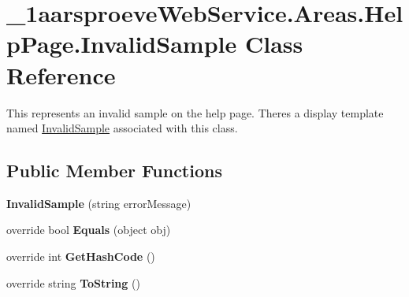 \hypertarget{class__1aarsproeve_web_service_1_1_areas_1_1_help_page_1_1_invalid_sample}{}\section{\+\_\+1aarsproeve\+Web\+Service.\+Areas.\+Help\+Page.\+Invalid\+Sample Class Reference}
\label{class__1aarsproeve_web_service_1_1_areas_1_1_help_page_1_1_invalid_sample}


This represents an invalid sample on the help page. There\textquotesingle{}s a display template named \hyperlink{class__1aarsproeve_web_service_1_1_areas_1_1_help_page_1_1_invalid_sample}{Invalid\+Sample} associated with this class.  


\subsection*{Public Member Functions}
\begin{DoxyCompactItemize}
\item 
\hypertarget{class__1aarsproeve_web_service_1_1_areas_1_1_help_page_1_1_invalid_sample_a1765a67a11a267d2a02438471821a853}{}{\bfseries Invalid\+Sample} (string error\+Message)\label{class__1aarsproeve_web_service_1_1_areas_1_1_help_page_1_1_invalid_sample_a1765a67a11a267d2a02438471821a853}

\item 
\hypertarget{class__1aarsproeve_web_service_1_1_areas_1_1_help_page_1_1_invalid_sample_a6cad532356f4b19d8b3175e5a0b15ce2}{}override bool {\bfseries Equals} (object obj)\label{class__1aarsproeve_web_service_1_1_areas_1_1_help_page_1_1_invalid_sample_a6cad532356f4b19d8b3175e5a0b15ce2}

\item 
\hypertarget{class__1aarsproeve_web_service_1_1_areas_1_1_help_page_1_1_invalid_sample_ab5b125556be4287c86458a81926863bd}{}override int {\bfseries Get\+Hash\+Code} ()\label{class__1aarsproeve_web_service_1_1_areas_1_1_help_page_1_1_invalid_sample_ab5b125556be4287c86458a81926863bd}

\item 
\hypertarget{class__1aarsproeve_web_service_1_1_areas_1_1_help_page_1_1_invalid_sample_a5ee58359dbb090cde32a683584f5fdd2}{}override string {\bfseries To\+String} ()\label{class__1aarsproeve_web_service_1_1_areas_1_1_help_page_1_1_invalid_sample_a5ee58359dbb090cde32a683584f5fdd2}

\end{DoxyCompactItemize}
